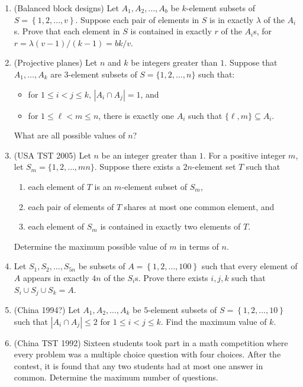 \documentclass[11pt,paper=letter]{scrartcl}
\begin{document}
\begin{enumerate}

\item (Balanced block designs) Let $A_1, A_2, \ldots, A_b$ be $k$-element subsets of $ S = \left\{ 1, 2, \ldots, v \right\} $. Suppose each pair of elements in $S$ is in exactly $\lambda$ of the $A_i$s. Prove that each element in $S$ is contained in exactly $r$ of the $A_i$s, for $r = \lambda(v-1)/(k-1) = bk/v$. \hint{\ref{h:1}}

\item (Projective planes) Let $n$ and $k$ be integers greater than $1$. Suppose that $A_1, \ldots, A_k$ are $3$-element subsets of $S = \{1, 2, \ldots, n\}$ such that:
\begin{itemize}
  \item for $1 \le i < j \le k$, $|A_i \cap A_j| = 1$, and
  \item for $1 \le \ell < m \le n$, there is exactly one $A_i$ such that $\{\ell, m\} \subseteq A_i$.
\end{itemize}
What are all possible values of $n$?

\item (USA TST 2005) Let $n$ be an integer greater than $1$. For a positive integer $m$, let $S_m = \{1, 2, \ldots, mn\}$. Suppose there exists a $2n$-element set $T$ such that
\begin{enumerate}
  \item each element of $T$ is an $m$-element subset of $S_m$,
  \item each pair of elements of $T$ shares at most one common element, and
  \item each element of $S_m$ is contained in exactly two elements of $T$.
\end{enumerate}
Determine the maximum possible value of $m$ in terms of $n$. \hint{\ref{h:2}}

\item Let $S_1, S_2, \ldots, S_{5n}$ be subsets of $A = \left\{ 1, 2, \ldots, 100 \right\} $ such that every element of $A$ appears in exactly $4n$ of the $S_i$s. Prove there exists $i, j, k$ such that $S_i \cup S_j \cup S_k = A$.

\item (China 1994?) Let $A_1, A_2, \ldots, A_k$ be $5$-element subsets of $S = \left\{ 1, 2, \ldots, 10 \right\} $ such that $|A_i \cap A_j| \le 2$ for $1 \le i < j \le k$. Find the maximum value of $k$. \hint{\ref{h:3}}

\item (China TST 1992) Sixteen students took part in a math competition where every problem was a multiple choice question with four choices. After the contest, it is found that any two students had at most one answer in common. Determine the maximum number of questions. \hint{\ref{h:3}}


\end{enumerate}
\end{document}

